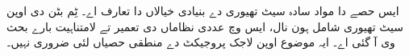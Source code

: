 \documentclass[../../include/open-logic-part]{subfiles}
\begin{document}

\begin{editorial}
  ایس حصے دا مواد سادہ سیٹ تھیوری دے بنیادی خیالاں دا تعارف اے۔ ٹِم بٹن
  دی اوپن سیٹ تھیوری شامل ہون نال، ایس وچ عددی نظاماں دی تعمیر تے
  لامتناہیت بارے بحث وی آ گئی اے۔ ایہ موضوع اوپن لاجک پروجیکٹ دے منطقی
  حصیاں لئی ضروری نہیں۔
\end{editorial}







\OLEndPartHook
\end{document}
